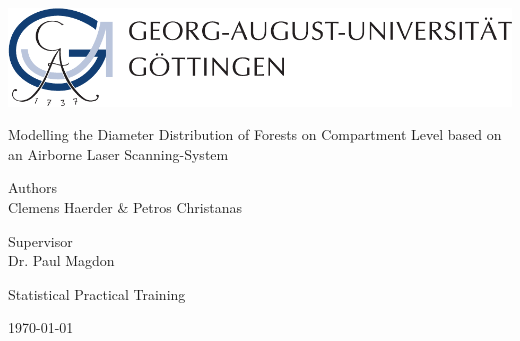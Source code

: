 
\thispagestyle{empty}
\begin{center}


\begin{minipage}{0.75\linewidth}
    \centering
    \includegraphics[scale = 0.7]{Logo.pdf}\\
    
    \vspace{3cm}
    {{\LARGE Modelling the Diameter Distribution of Forests on Compartment Level based on an Airborne Laser Scanning-System\par}}
    \vspace{3cm}
\begin{center}
Authors\\
{\Large Clemens Haerder \& Petros Christanas} \\

\vspace{2cm}

Supervisor\\
{\large Dr. Paul Magdon}
\end{center}
    
    \vspace{2cm}
    {\Large Statistical Practical Training\par}
    \vspace{2cm}
    {\normalsize \today}
\end{minipage}
\end{center}
\clearpage